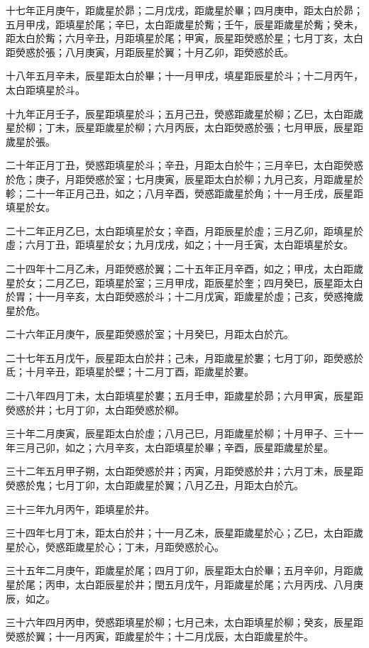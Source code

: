 \begin{pinyinscope}
十七年正月庚午，距歲星於昴；二月戊戌，距歲星於畢；四月庚申，距太白於昴；五月甲戌，距填星於尾；辛巳，太白距歲星於觜；壬午，辰星距歲星於觜；癸未，距太白於觜；六月辛丑，月距填星於尾；甲寅，辰星距熒惑於星；七月丁亥，太白距熒惑於張；八月庚寅，月距辰星於翼；十月乙卯，距熒惑於氐。

十八年五月辛未，辰星距太白於畢；十一月甲戌，填星距辰星於斗；十二月丙午，太白距填星於斗。

十九年正月壬子，辰星距填星於斗；五月己丑，熒惑距歲星於柳；乙巳，太白距歲星於柳；丁未，辰星距歲星於柳；六月丙辰，太白距熒惑於張；七月甲辰，辰星距歲星於張。

二十年正月丁丑，熒惑距填星於斗；辛丑，月距太白於牛；三月辛巳，太白距熒惑於危；庚子，月距熒惑於室；七月庚寅，辰星距太白於柳；九月己亥，月距歲星於軫；二十一年正月己丑，如之；八月辛酉，熒惑距歲星於角；十一月壬戌，辰星距填星於女。

二十二年正月乙巳，太白距填星於女；辛酉，月距辰星於虛；三月乙卯，距填星於虛；六月丁丑，距填星於女；九月戊戌，如之；十一月壬寅，太白距填星於女。

二十四年十二月乙未，月距熒惑於翼；二十五年正月辛酉，如之；甲戌，太白距歲星於女；二月乙巳，距填星於室；三月甲戌，距辰星於奎；四月癸巳，辰星距太白於胃；十一月辛亥，太白距熒惑於斗；十二月戊寅，距歲星於虛；己亥，熒惑掩歲星於危。

二十六年正月庚午，辰星距熒惑於室；十月癸巳，月距太白於亢。

二十七年五月戊午，辰星距太白於井；己未，月距歲星於婁；七月丁卯，距熒惑於氐；十月辛丑，距填星於壁；十二月丁酉，距歲星於婁。

二十八年四月丁未，太白距填星於婁；五月壬申，距歲星於昴；六月甲寅，辰星距熒惑於井；七月丁卯，太白距熒惑於柳。

三十年二月庚寅，辰星距太白於虛；八月己巳，月距歲星於柳；十月甲子、三十一年三月己卯，如之；六月辛亥，太白距填星於畢；辛酉，辰星距歲星於星。

三十二年五月甲子朔，太白距熒惑於井；丙寅，月距熒惑於井；六月丁未，辰星距熒惑於鬼；七月丁卯，太白距歲星於翼；八月乙丑，月距太白於亢。

三十三年九月丙午，距填星於井。

三十四年七月丁未，距太白於井；十一月乙未，辰星距歲星於心；乙巳，太白距歲星於心，熒惑距歲星於心；丁未，月距熒惑於心。

三十五年二月庚午，距歲星於尾；四月丁卯，辰星距太白於畢；五月辛卯，月距歲星於尾；丙申，太白距辰星於井；閏五月戊午，月距歲星於尾；六月丙戌、八月庚辰，如之。

三十六年四月丙申，熒惑距填星於柳；七月己未，太白距填星於柳；癸亥，辰星距熒惑於翼；十一月丙寅，距歲星於牛；十二月戊辰，太白距歲星於牛。


\end{pinyinscope}
